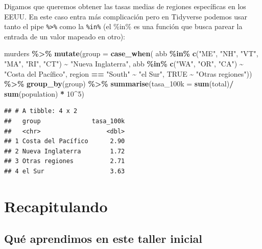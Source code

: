 \documentclass[
]{article}
\newenvironment{Shaded}{\begin{snugshade}}{\end{snugshade}}
\newcommand{\AttributeTok}[1]{\textcolor[rgb]{0.13,0.29,0.53}{#1}}
\newcommand{\ConstantTok}[1]{\textcolor[rgb]{0.56,0.35,0.01}{#1}}
\newcommand{\DecValTok}[1]{\textcolor[rgb]{0.00,0.00,0.81}{#1}}
\newcommand{\FunctionTok}[1]{\textcolor[rgb]{0.13,0.29,0.53}{\textbf{#1}}}
\newcommand{\NormalTok}[1]{#1}
\newcommand{\SpecialCharTok}[1]{\textcolor[rgb]{0.81,0.36,0.00}{\textbf{#1}}}
\newcommand{\StringTok}[1]{\textcolor[rgb]{0.31,0.60,0.02}{#1}}
\begin{document}
Digamos que queremos obtener las tasas medias de regiones específicas en
los EEUU. En este caso entra más complicación pero en Tidyverse podemos
usar tanto el pipe \texttt{\%\textgreater{}\%} como la \texttt{\%in\%}
(el \%in\% es una función que busca parear la entrada de un valor
mapeado en otro):

\begin{Shaded}
\begin{Highlighting}[]
\NormalTok{murders }\SpecialCharTok{\%\textgreater{}\%}
  \FunctionTok{mutate}\NormalTok{(}\AttributeTok{group =} \FunctionTok{case\_when}\NormalTok{(}
\NormalTok{    abb }\SpecialCharTok{\%in\%} \FunctionTok{c}\NormalTok{(}\StringTok{"ME"}\NormalTok{, }\StringTok{"NH"}\NormalTok{, }\StringTok{"VT"}\NormalTok{, }\StringTok{"MA"}\NormalTok{, }\StringTok{"RI"}\NormalTok{, }\StringTok{"CT"}\NormalTok{) }\SpecialCharTok{\textasciitilde{}} \StringTok{"Nueva Inglaterra"}\NormalTok{,}
\NormalTok{    abb }\SpecialCharTok{\%in\%} \FunctionTok{c}\NormalTok{(}\StringTok{"WA"}\NormalTok{, }\StringTok{"OR"}\NormalTok{, }\StringTok{"CA"}\NormalTok{) }\SpecialCharTok{\textasciitilde{}} \StringTok{"Costa del Pacífico"}\NormalTok{,}
\NormalTok{    region }\SpecialCharTok{==} \StringTok{"South"} \SpecialCharTok{\textasciitilde{}} \StringTok{"el Sur"}\NormalTok{,}
    \ConstantTok{TRUE} \SpecialCharTok{\textasciitilde{}} \StringTok{"Otras regiones"}\NormalTok{)) }\SpecialCharTok{\%\textgreater{}\%}
  \FunctionTok{group\_by}\NormalTok{(group) }\SpecialCharTok{\%\textgreater{}\%}
  \FunctionTok{summarise}\NormalTok{(}\AttributeTok{tasa\_100k =} \FunctionTok{sum}\NormalTok{(total)}\SpecialCharTok{/} \FunctionTok{sum}\NormalTok{(population) }\SpecialCharTok{*} \DecValTok{10}\SpecialCharTok{\^{}}\DecValTok{5}\NormalTok{)}
\end{Highlighting}
\end{Shaded}

\begin{verbatim}
## # A tibble: 4 x 2
##   group              tasa_100k
##   <chr>                  <dbl>
## 1 Costa del Pacífico      2.90
## 2 Nueva Inglaterra        1.72
## 3 Otras regiones          2.71
## 4 el Sur                  3.63
\end{verbatim}

\section{Recapitulando}\label{recapitulando}

\subsection{Qué aprendimos en este taller
inicial}\label{quuxe9-aprendimos-en-este-taller-inicial}
\end{document}
